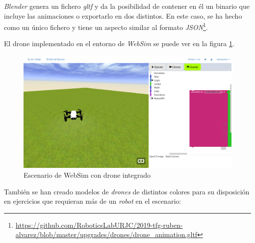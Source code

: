 \textit{Blender} genera un fichero \textit{gltf} y da la posibilidad de contener en él un binario que incluye las animaciones o exportarlo en dos distintos. En este caso, se ha hecho como un único fichero y tiene un aspecto similar al formato \textit{JSON}\footnote{\url{https://github.com/RoboticsLabURJC/2019-tfg-ruben-alvarez/blob/master/upgrades/drones/drone_animation.gltf}}. 

El drone implementado en el entorno de \textit{WebSim} se puede ver en la figura \ref{fig:escenarioDrone}.

   \begin{figure}[H]
    \centering
    \includegraphics[scale=0.3]{img/websimDrone.png}
    \caption{Escenario de WebSim con drone integrado} \label{fig:escenarioDrone}
    \end{figure}

También se han creado modelos de \textit{drones} de distintos colores para su disposición en ejercicios que requieran más de un \textit{robot} en el escenario: 

